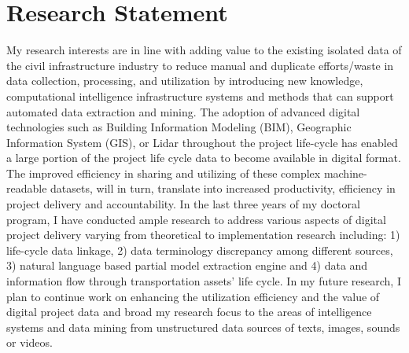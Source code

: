 \documentclass[a4paper,11pt]{article}
\begin{document}
\linenumbers
\singlespacing
{}
\sectionfont{\sectionrule{0ex}{0pt}{-1ex}{.75pt}}
\section*{Research Statement}
%
My research interests are in line with adding value to the existing isolated data of the civil infrastructure industry to reduce manual and duplicate efforts/waste in data collection, processing, and utilization by introducing new knowledge, computational intelligence infrastructure systems and methods that can support automated data extraction and mining.
%
The adoption of advanced digital technologies such as Building Information Modeling (BIM), Geographic Information System (GIS), or Lidar throughout the project life-cycle has enabled a large portion of the project life cycle data to become available in digital format. 
%
The improved efficiency in sharing and utilizing of these complex machine-readable datasets, will in turn, translate into increased productivity, efficiency in project delivery and accountability.
%
In the last three years of my doctoral program, I have conducted ample research to address various aspects of digital project delivery varying from theoretical to implementation research including: 1) life-cycle data linkage, 2) data terminology discrepancy among different sources, 3) natural language based partial model extraction engine and 4) data and information flow through transportation assets' life cycle.
%
In my future research, I plan to continue work on enhancing the utilization efficiency and the value of digital project data and broad my research focus to the areas of intelligence systems and data mining from unstructured data sources of texts, images, sounds or videos.
%


\end{document}
